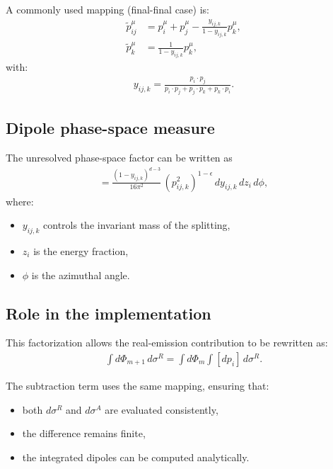 A commonly used mapping (final-final case) is:
\begin{align}
\tilde{p}_{ij}^\mu &= p_i^\mu + p_j^\mu - \frac{y_{ij,k}}{1 - y_{ij,k}} p_k^\mu, \\
\tilde{p}_k^\mu &= \frac{1}{1 - y_{ij,k}} p_k^\mu,
\end{align}
with:
\begin{align}
y_{ij,k} = \frac{p_i \cdot p_j}{p_i \cdot p_j + p_j \cdot p_k + p_k \cdot p_i}.
\end{align}

\subsection{Dipole phase-space measure}

The unresolved phase-space factor can be written as
\begin{align}
[dp_i(\tilde{p}_{ij}, \tilde{p}_k)] =
\frac{(1 - y_{ij,k})^{d-3}}{16\pi^2}
\, (p_{ij,k}^2)^{1-\epsilon}
\, dy_{ij,k} \, dz_i \, d\phi,
\end{align}
where:
\begin{itemize}
    \item $y_{ij,k}$ controls the invariant mass of the splitting,
    \item $z_i$ is the energy fraction,
    \item $\phi$ is the azimuthal angle.
\end{itemize}

\subsection{Role in the implementation}

This factorization allows the real-emission contribution to be rewritten as:
\begin{align}
\int d\Phi_{m+1} \, d\sigma^R =
\int d\Phi_m \int [dp_i] \, d\sigma^R.
\end{align}

The subtraction term uses the same mapping, ensuring that:
\begin{itemize}
    \item both $d\sigma^R$ and $d\sigma^A$ are evaluated consistently,
    \item the difference remains finite,
    \item the integrated dipoles can be computed analytically.
\end{itemize}
